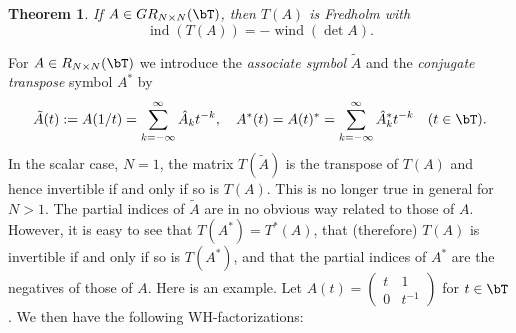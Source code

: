 \documentclass[addpoints,12pt,letter]{article}
\DeclareMathOperator{\ind}{ind}
\DeclareMathOperator{\wind}{wind}
\newcommand{\nf}{\infty}
\newcommand{\ti}{\tilde}
\numberwithin{equation}{section}
\newtheorem{theorem}[lemma]{Theorem}
\theoremstyle{definition}
\begin{document}
\begin{theorem}\label{th:Fredholm}
If $A\in GR_{N\times N}(\bT)$, then $T(A)$ is Fredholm with
\[
\ind(T(A))=-\wind(\det A).
\]
\end{theorem}

For $A\in R_{N\times N}(\bT)$ we introduce the {\em associate symbol} $\ti{A}$ and the {\em conjugate transpose} symbol $A^{\ast}$ by
\[
\ti{A}(t):=A(1/t)=\sum_{k=-\nf}^{\nf} \hat{A}_{k} t^{-k}, \quad A^{\ast}(t)=A(t)^{\ast}=\sum_{k=-\nf}^{\nf} \hat{A}_{k}^{\ast}t^{-k}\quad (t\in\bT).
\]
In the scalar case, $N=1$, the matrix $T(\ti{A})$ is the transpose of $T(A)$ and hence invertible if and only if so is $T(A)$.
This is no longer true in general for $N>1$.
The partial indices of $\ti{A}$ are in no obvious way related to those of $A$.
However, it is easy to see that $T(A^{\ast})=T^{\ast}(A)$, that (therefore) $T(A)$ is invertible if and only if so is $T(A^{\ast})$, and that the partial indices of $A^{\ast}$ are the negatives of those of $A$.
Here is an example.
Let $A(t)=\begin{pmatrix} t & 1\\ 0 & t^{-1}\end{pmatrix}$ for $t\in\bT$.
We then have the following WH-factorizations:
\end{document}
